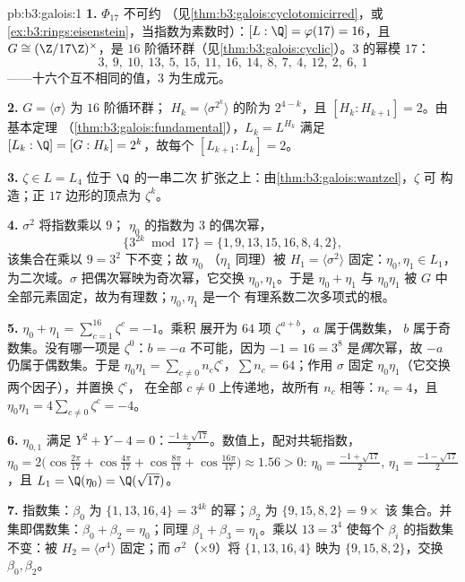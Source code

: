 \begin{solution}{pb:b3:galois:1}
\textbf{1.} $\Phi_{17}$ 不可约
（见\cref{thm:b3:galois:cyclotomicirred}，或
\cref{ex:b3:rings:eisenstein}，当指数为素数时）：$[L:\Q] =
\varphi(17) = 16$，且 $G \cong (\Z/17\Z)^\times$，是
$16$ 阶循环群（见\cref{thm:b3:galois:cyclic}）。$3$ 的幂模
$17$：
\[
3,\ 9,\ 10,\ 13,\ 5,\ 15,\ 11,\ 16,\ 14,\ 8,\ 7,\ 4,\ 12,\ 2,\
6,\ 1
\]
——十六个互不相同的值，$3$ 为生成元。

\textbf{2.} $G = \langle\sigma\rangle$ 为 $16$ 阶循环群；
$H_k = \langle\sigma^{2^k}\rangle$ 的阶为 $2^{4-k}$，且
$[H_k : H_{k+1}] = 2$。由基本定理
（\cref{thm:b3:galois:fundamental}），$L_k = L^{H_k}$ 满足
$[L_k : \Q] = [G : H_k] = 2^k$，故每个 $[L_{k+1}:L_k] = 2$。

\textbf{3.} $\zeta \in L = L_4$ 位于 $\Q$ 的一串二次
扩张之上：由\cref{thm:b3:galois:wantzel}，$\zeta$ 可
构造；正 $17$ 边形的顶点为 $\zeta^k$。

\textbf{4.} $\sigma^2$ 将指数乘以 $9$；
$\eta_0$ 的指数为 $3$ 的偶次幂，
\[
\{3^{2k} \bmod 17\} = \{1, 9, 13, 15, 16, 8, 4, 2\},
\]
该集合在乘以 $9 = 3^2$ 下不变；故 $\eta_0$
（$\eta_1$ 同理）被 $H_1 =
\langle\sigma^2\rangle$ 固定：$\eta_0, \eta_1 \in L_1$，
为二次域。$\sigma$ 把偶次幂映为奇次幂，它交换 $\eta_0,
\eta_1$。于是 $\eta_0 + \eta_1$ 与 $\eta_0\eta_1$ 被
$G$ 中全部元素固定，故为有理数；$\eta_0, \eta_1$ 是一个
有理系数二次多项式的根。

\textbf{5.} $\eta_0 + \eta_1 = \sum_{c=1}^{16}\zeta^c = -1$。乘积
展开为 $64$ 项 $\zeta^{a + b}$，$a$ 属于偶数集，
$b$ 属于奇数集。没有哪一项是 $\zeta^0$：$b = -a$
不可能，因为 $-1 = 16 = 3^8$ 是\emph{偶}次幂，故
$-a$ 仍属于偶数集。于是 $\eta_0\eta_1 = \sum_{c \neq 0}
n_c\zeta^c$，$\sum n_c = 64$；作用 $\sigma$ 固定
$\eta_0\eta_1$（它交换两个因子），并置换 $\zeta^c$，
在全部 $c \neq 0$ 上传递地，故所有 $n_c$ 相等：$n_c
= 4$，且 $\eta_0\eta_1 = 4\sum_{c\neq0}\zeta^c = -4$。

\textbf{6.} $\eta_{0,1}$ 满足 $Y^2 + Y - 4 = 0$：$\frac{-1 \pm
\sqrt{17}}2$。数值上，配对共轭指数，
$\eta_0 = 2\bigl(\cos\tfrac{2\pi}{17} + \cos\tfrac{4\pi}{17} +
\cos\tfrac{8\pi}{17} + \cos\tfrac{16\pi}{17}\bigr) \approx 1.56
> 0$: $\eta_0 = \frac{-1+\sqrt{17}}2$, $\eta_1 =
\frac{-1-\sqrt{17}}2$，且 $L_1 = \Q(\eta_0) = \Q(\sqrt{17})$。

\textbf{7.} 指数集：$\beta_0$ 为 $\{1, 13, 16, 4\}$ =
$3^{4k}$ 的幂；$\beta_2$ 为 $\{9, 15, 8, 2\}$ = $9 \times$ 该
集合。并集即偶数集：$\beta_0 + \beta_2 = \eta_0$；同理
$\beta_1 + \beta_3 = \eta_1$。乘以 $13 = 3^4$
使每个 $\beta_i$ 的指数集不变：被 $H_2 =
\langle\sigma^4\rangle$ 固定；而 $\sigma^2$（$\times 9$）将
$\{1,13,16,4\}$ 映为 $\{9, 15, 8, 2\}$，交换 $\beta_0,
\beta_2$。


\end{solution}
